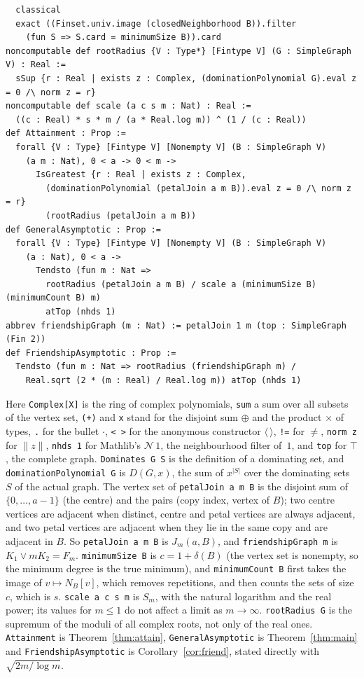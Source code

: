 \documentclass[11pt]{article}
\theoremstyle{definition}
\theoremstyle{remark}
\begin{document}
{{\begin{verbatim}
  classical
  exact ((Finset.univ.image (closedNeighborhood B)).filter
    (fun S => S.card = minimumSize B)).card
noncomputable def rootRadius {V : Type*} [Fintype V] (G : SimpleGraph V) : Real :=
  sSup {r : Real | exists z : Complex, (dominationPolynomial G).eval z = 0 /\ norm z = r}
noncomputable def scale (a c s m : Nat) : Real :=
  ((c : Real) * s * m / (a * Real.log m)) ^ (1 / (c : Real))
def Attainment : Prop :=
  forall {V : Type} [Fintype V] [Nonempty V] (B : SimpleGraph V)
    (a m : Nat), 0 < a -> 0 < m ->
      IsGreatest {r : Real | exists z : Complex,
        (dominationPolynomial (petalJoin a m B)).eval z = 0 /\ norm z = r}
        (rootRadius (petalJoin a m B))
def GeneralAsymptotic : Prop :=
  forall {V : Type} [Fintype V] [Nonempty V] (B : SimpleGraph V)
    (a : Nat), 0 < a ->
      Tendsto (fun m : Nat =>
        rootRadius (petalJoin a m B) / scale a (minimumSize B) (minimumCount B) m)
        atTop (nhds 1)
abbrev friendshipGraph (m : Nat) := petalJoin 1 m (top : SimpleGraph (Fin 2))
def FriendshipAsymptotic : Prop :=
  Tendsto (fun m : Nat => rootRadius (friendshipGraph m) /
    Real.sqrt (2 * (m : Real) / Real.log m)) atTop (nhds 1)
\end{verbatim}}
\noindent Here \texttt{Complex[X]} is the ring of complex polynomials,
\texttt{sum} a sum over all subsets of the vertex set, \texttt{(+)} and
\texttt{x} stand for the disjoint sum $\oplus$ and the product $\times$ of
types, \texttt{.} for the bullet $\cdot$, \texttt{<\,>} for the anonymous
constructor $\langle\,\rangle$, \texttt{!=} for $\ne$, \texttt{norm z} for
$\|z\|$, \texttt{nhds 1} for Mathlib's $\mathcal N\,1$, the neighbourhood filter
of~$1$, and \texttt{top} for
$\top$, the complete graph. \texttt{Dominates G S} is the definition of a
dominating set, and \texttt{dominationPolynomial G} is $D(G,x)$, the sum of
$x^{|S|}$ over the dominating sets $S$ of the actual graph. The vertex set of
\texttt{petalJoin a m B} is the disjoint sum of $\{0,\dots,a-1\}$ (the centre)
and the pairs (copy index, vertex of $B$); two centre vertices are adjacent
when distinct, centre and petal vertices are always adjacent, and two petal
vertices are adjacent when they lie in the same copy and are adjacent in $B$.
So \texttt{petalJoin a m B} is $J_m(a,B)$, and \texttt{friendshipGraph m} is
$K_1\vee mK_2=F_m$. \texttt{minimumSize B} is $c=1+\delta(B)$ (the vertex set
is nonempty, so the minimum degree is the true minimum), and
\texttt{minimumCount B} first takes the image of $v\mapsto N_B[v]$, which
removes repetitions, and then counts the sets of size $c$, which is $s$.
\texttt{scale a c s m} is $S_m$, with the natural logarithm and the real
power; its values for $m\le1$ do not affect a limit as $m\to\infty$.
\texttt{rootRadius G} is the supremum of the moduli of all complex roots, not
only of the real ones. \texttt{Attainment} is Theorem~\ref{thm:attain},
\texttt{GeneralAsymptotic} is Theorem~\ref{thm:main} and
\texttt{FriendshipAsymptotic} is Corollary~\ref{cor:friend}, stated directly
with $\sqrt{2m/\log m}$.

}
\end{document}
